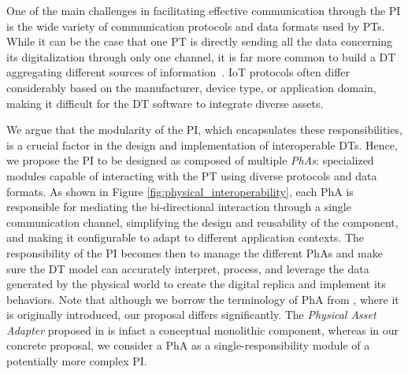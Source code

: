 One of the main challenges in facilitating effective communication through the \ac{PI} is the wide variety of communication protocols and data formats used by \acp{PT}.
%
While it can be the case that one \ac{PT} is directly sending all the data concerning its digitalization through only one channel,
it is far more common to build a \ac{DT} aggregating different sources of information~\cite{qi2018dt-and-bigdata}.
%
\ac{IoT} protocols often differ considerably based on the manufacturer, device type, or application domain, making it difficult for the \ac{DT} software to integrate diverse assets.

%
We argue that the modularity of the \ac{PI}, which encapsulates these responsibilities, is a crucial factor in the design and implementation of interoperable \acp{DT}.
%
Hence, we propose the \ac{PI} to be designed as composed of multiple \emph{\acp{PhA}}: specialized modules capable of interacting with the \ac{PT} using diverse protocols and data formats.
%
As shown in Figure \ref{fig:physical_interoperability}, each \ac{PhA} is responsible for mediating the bi-directional interaction through a single communication channel, simplifying the design and reusability of the component, and making it configurable to adapt to different application contexts.
%
The responsibility of the \ac{PI} becomes then to manage the different \acp{PhA} and make sure the \ac{DT} model can accurately interpret, process, and leverage the data generated by the physical world to create the digital replica and implement its behaviors.
%
Note that although we borrow the terminology of \ac{PhA} from \cite{web-of-dt-ricci-2022}, where it is originally introduced, our proposal differs significantly.
The \emph{Physical Asset Adapter} proposed in \cite{web-of-dt-ricci-2022} is infact a conceptual monolithic component, whereas in our concrete proposal, we consider a \ac{PhA} as a single-responsibility module of a potentially more complex \ac{PI}.


